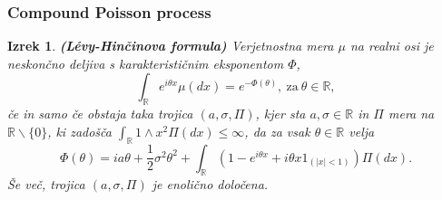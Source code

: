 \documentclass[]{beamer} %
\theoremstyle{plain}
\newtheorem{izrek}{Izrek}
\begin{document}
\begin{frame}
  \frametitle{Compound Poisson process}
\end{frame}


\begin{frame}
  \begin{izrek}
    \textbf{(Lévy-Hinčinova formula)} Verjetnostna mera $\mu$ na realni osi je neskončno deljiva s 
    karakterističnim eksponentom $\Phi$,
    $$
    \int_{\mathbb{R}} e^{i\theta x} \mu(dx) = e^{-\Phi(\theta)},\ \text{za} \ \theta \in \mathbb{R},
    $$
    če in samo če obstaja taka trojica $(a, \sigma, \Pi)$, kjer sta $a, \sigma \in \mathbb{R}$ in $\Pi$
    mera na $\mathbb{R}\backslash\{0\}$, ki zadošča $\int_{\mathbb{R}}1 \wedge x^2 \Pi(dx)\leq \infty$, 
    da za vsak $\theta \in \mathbb{R}$ velja
    $$
    \Phi(\theta) = ia\theta + \frac{1}{2}\sigma^2\theta^2 + \int_{\mathbb{R}}(1 - e^{i\theta x} 
    + i\theta x {1}_{(|x|<1)})\Pi(dx).
    $$
    Še več, trojica $(a, \sigma, \Pi)$ je enolično določena.
  \end{izrek}
\end{frame}
\end{document}

